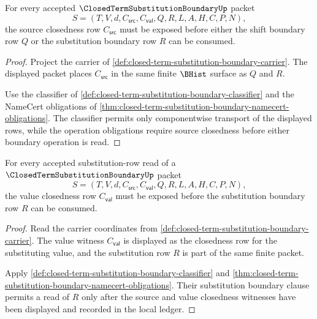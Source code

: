 \begin{theorem}
\label{thm:closed-term-substitution-boundary-source-closedness-admission}
For every accepted $\ClosedTermSubstitutionBoundaryUp$ packet
$$
S=(T,V,d,C_{\mathsf{src}},C_{\mathsf{val}},Q,R,L,A,H,C,P,N),
$$
the source closedness row $C_{\mathsf{src}}$ must be exposed before either the shift boundary row $Q$ or the substitution boundary row $R$ can be consumed.
\end{theorem}
\begin{proof}
Project the carrier of \autoref{def:closed-term-substitution-boundary-carrier}. The displayed packet places $C_{\mathsf{src}}$ in the same finite $\BHist$ surface as $Q$ and $R$.

Use the classifier of \autoref{def:closed-term-substitution-boundary-classifier} and the NameCert obligations of \autoref{thm:closed-term-substitution-boundary-namecert-obligations}. The classifier permits only componentwise transport of the displayed rows, while the operation obligations require source closedness before either boundary operation is read.
\end{proof}

\begin{theorem}
\label{thm:closed-term-substitution-boundary-value-closedness-admission}
For every accepted substitution-row read of a $\ClosedTermSubstitutionBoundaryUp$ packet
$$
S=(T,V,d,C_{\mathsf{src}},C_{\mathsf{val}},Q,R,L,A,H,C,P,N),
$$
the value closedness row $C_{\mathsf{val}}$ must be exposed before the substitution boundary row $R$ can be consumed.
\end{theorem}
\begin{proof}
Read the carrier coordinates from \autoref{def:closed-term-substitution-boundary-carrier}. The value witness $C_{\mathsf{val}}$ is displayed as the closedness row for the substituting value, and the substitution row $R$ is part of the same finite packet.

Apply \autoref{def:closed-term-substitution-boundary-classifier} and \autoref{thm:closed-term-substitution-boundary-namecert-obligations}. Their substitution boundary clause permits a read of $R$ only after the source and value closedness witnesses have been displayed and recorded in the local ledger.
\end{proof}

